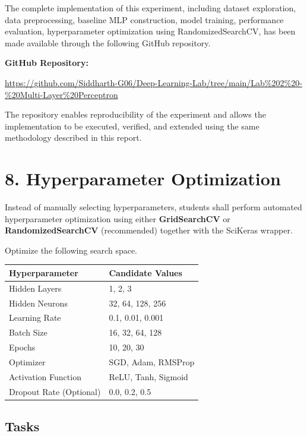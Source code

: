 \documentclass[11pt]{article}
\begin{document}
The complete implementation of this experiment, including dataset exploration, data preprocessing, baseline MLP construction, model training, performance evaluation, hyperparameter optimization using RandomizedSearchCV,  has been made available through the following GitHub repository.

\bigskip

\noindent
\textbf{GitHub Repository:}

\url{https://github.com/Siddharth-G06/Deep-Learning-Lab/tree/main/Lab%202%20-%20Multi-Layer%20Perceptron}

\bigskip

The repository enables reproducibility of the experiment and allows the implementation to be executed, verified, and extended using the same methodology described in this report.

\section*{8. Hyperparameter Optimization}

Instead of manually selecting hyperparameters, students shall perform automated hyperparameter optimization using either \textbf{GridSearchCV} or \textbf{RandomizedSearchCV} (recommended) together with the SciKeras wrapper.

Optimize the following search space.

\begin{center}
\begin{tabular}{|p{5cm}|p{7cm}|}
\hline
Hyperparameter & Candidate Values\\
\hline
Hidden Layers & 1, 2, 3\\
Hidden Neurons & 32, 64, 128, 256\\
Learning Rate & 0.1, 0.01, 0.001\\
Batch Size & 16, 32, 64, 128\\
Epochs & 10, 20, 30\\
Optimizer & SGD, Adam, RMSProp\\
Activation Function & ReLU, Tanh, Sigmoid\\
Dropout Rate (Optional) & 0.0, 0.2, 0.5\\
\hline
\end{tabular}
\end{center}

\subsection*{Tasks}
\end{document}
